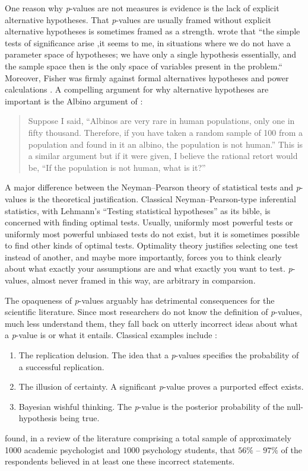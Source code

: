 One reason why \textit{p}-values are not measures is evidence is the lack of explicit alternative hypotheses. That \textit{p}-values are usually framed without explicit alternative hypotheses is sometimes framed as a strength. \textcite[p. 308]{Barnard1962-rz} wrote that ``the simple tests of significance arise ,it seems to me, in situations where we do not have a parameter space of hypotheses; we have only a single hypothesis essentially, and the sample space then is the only space of variables present in the problem.`` Moreover, Fisher was firmly against formal alternatives hypotheses and power calculations \parencite{Lehmann1993-oa}. A compelling argument for why alternative hypotheses are important is the Albino argument of \textcite{Berkson1942-hj}:
\begin{quotation}
Suppose I said, \textquotedblleft Albinos are very rare in human populations, only one in fifty thousand. Therefore, if you have taken a random sample of 100 from a population and found in it an albino, the population is not human.\textquotedblright{} This is a similar argument but if it were given, I believe the rational retort would be, \textquotedblleft If the population is not human, what is it?\textquotedblright{} 
\end{quotation}
A major difference between the Neyman--Pearson theory of statistical tests and \textit{p}-values is the theoretical justification. Classical Neyman--Pearson-type inferential statistics, with Lehmann's ``Testing statistical hypotheses'' \parencite{Lehmann2005-sp} as its bible, is concerned with finding optimal tests. Usually, uniformly most powerful tests or uniformly most powerful unbiased tests do not exist, but it is sometimes possible to find other kinds of optimal tests. Optimality theory justifies selecting one test instead of another, and maybe more importantly, forces you to think clearly about what exactly your assumptions are and what exactly you want to test. \textit{p}-values, almost never framed in this way, are arbitrary in comparsion.

The opaqueness of \textit{p}-values arguably has detrimental consequences for the scientific literature. Since most researchers do not know the definition of \textit{p}-values, much less understand them, they fall back on utterly incorrect ideas about what a \textit{p}-value is or what it entails. Classical examples include \parencite{Gigerenzer2018-oi}:
\begin{enumerate}[label=(\alph*)]
    \item The replication delusion. The idea that a  \textit{p}-values specifies the probability of a successful replication.
    \item The illusion of certainty. A significant \textit{p}-value proves a purported effect exists.
    \item Bayesian wishful thinking. The \textit{p}-value is the posterior probability of the null-hypothesis being true.
\end{enumerate}
\textcite{Gigerenzer2018-oi} found, in a review of the literature comprising a total sample of approximately 1000 academic psychologist and $1000$ psychology students, that $56\%$ -- $97\%$ of the respondents believed in at least one these incorrect statements. 


